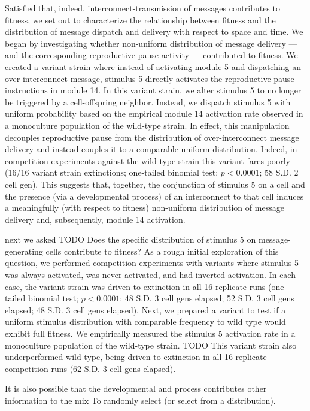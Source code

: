 Satisfied that, indeed, interconnect-transmission of messages contributes to fitness, we set out to characterize the relationship between fitness and the distribution of message dispatch and delivery with respect to space and time.
We began by investigating whether non-uniform distribution of message delivery --- and the corresponding reproductive pause activity --- contributed to fitness.
We created a variant strain where instead of activating module 5 and dispatching an over-interconnect message, stimulus 5 directly activates the reproductive pause instructions in module 14.
In this variant strain, we alter stimulus 5 to no longer be triggered by a cell-offspring neighbor.
Instead, we dispatch stimulus 5 with uniform probability based on the empirical module 14 activation rate observed in a monoculture population of the wild-type strain.
In effect, this manipulation decouples reproductive pause from the distribution of over-interconnect message delivery and instead couples it to a comparable uniform distribution.
Indeed, in competition experiments against the wild-type strain this variant fares poorly (16/16 variant strain extinctions; one-tailed binomial test; $p < 0.0001$; 58 S.D. 2 cell gen).
This suggests that, together, the conjunction of stimulus 5 on a cell and the presence (via a developmental process) of an interconnect to that cell induces a meaningfully (with respect to fitness) non-uniform distribution of message delivery and, subsequently, module 14 activation.

next we asked TODO
Does the specific distribution of stimulus 5 on message-generating cells contribute to fitness?
As a rough initial exploration of this question, we performed competition experiments with variants where stimulus 5 was always activated, was never activated, and had inverted activation.
In each case, the variant strain was driven to extinction in all 16 replicate runs (one-tailed binomial test; $p < 0.0001$; 48 S.D. 3 cell gens elapsed; 52 S.D. 3 cell gens elapsed; 48 S.D. 3 cell gens elapsed).
Next, we prepared a variant to test if a uniform stimulus distribution with comparable frequency to wild type would exhibit full fitness.
We empirically measured the stimulus 5 activation rate in a monoculture population of the wild-type strain. TODO
This variant strain also underperformed wild type, being driven to extinction in all 16 replicate competition runs (62 S.D. 3 cell gens elapsed).

It is also possible that the developmental and  process contributes other information to the mix
To randomly select (or select from a distribution).


